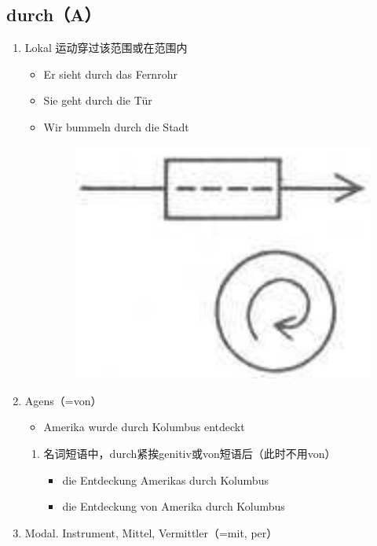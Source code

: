 \documentclass[UTF8]{report}
\begin{document}
\subsection{durch（A）}
\begin{enumerate}
    \item Lokal 运动穿过该范围或在范围内
    \begin{itemize}
        \item Er sieht durch das Fernrohr
        \item Sie geht durch die Tür
        \item Wir bummeln durch die Stadt
        \begin{figure}[H]
            \centering
            \includegraphics[scale=0.3]{durch.png}
        \end{figure}
    \end{itemize}
    \item Agens（=von）
    \begin{itemize}
        \item Amerika wurde durch Kolumbus entdeckt
    \end{itemize}
    \begin{enumerate}
        \item 名词短语中，durch紧挨genitiv或von短语后（此时不用von）
        \begin{itemize}
            \item die Entdeckung Amerikas durch Kolumbus
            \item die Entdeckung von Amerika durch Kolumbus
        \end{itemize}
    \end{enumerate}
    \item Modal. Instrument, Mittel, Vermittler（=mit, per）
    \begin{itemize}

\end{itemize}
\end{enumerate}
\end{document}
